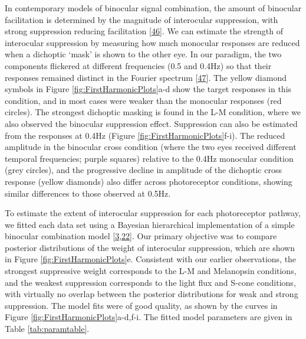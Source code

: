 \documentclass[
]{article}
\begin{document}
In contemporary models of binocular signal combination, the amount of binocular facilitation is determined by the magnitude of interocular suppression, with strong suppression reducing facilitation {[}\protect\hyperlink{ref-Kingdom2015}{46}{]}. We can estimate the strength of interocular suppression by measuring how much monocular responses are reduced when a dichoptic `mask' is shown to the other eye. In our paradigm, the two components flickered at different frequencies (0.5 and 0.4Hz) so that their responses remained distinct in the Fourier spectrum {[}\protect\hyperlink{ref-Busse2009}{47}{]}. The yellow diamond symbols in Figure \ref{fig:FirstHarmonicPlots}a-d show the target responses in this condition, and in most cases were weaker than the monocular responses (red circles). The strongest dichoptic masking is found in the L-M condition, where we also observed the binocular suppression effect. Suppression can also be estimated from the responses at 0.4Hz (Figure \ref{fig:FirstHarmonicPlots}f-i). The reduced amplitude in the binocular cross condition (where the two eyes received different temporal frequencies; purple squares) relative to the 0.4Hz monocular condition (grey circles), and the progressive decline in amplitude of the dichoptic cross response (yellow diamonds) also differ across photoreceptor conditions, showing similar differences to those observed at 0.5Hz.

To estimate the extent of interocular suppression for each photoreceptor pathway, we fitted each data set using a Bayesian hierarchical implementation of a simple binocular combination model {[}\protect\hyperlink{ref-Segala2023}{3},\protect\hyperlink{ref-Meese2006}{22}{]}. Our primary objective was to compare posterior distributions of the weight of interocular suppression, which are shown in Figure \ref{fig:FirstHarmonicPlots}e. Consistent with our earlier observations, the strongest suppressive weight corresponds to the L-M and Melanopsin conditions, and the weakest suppression corresponds to the light flux and S-cone conditions, with virtually no overlap between the posterior distributions for weak and strong suppression. The model fits were of good quality, as shown by the curves in Figure \ref{fig:FirstHarmonicPlots}a-d,f-i. The fitted model parameters are given in Table \ref{tab:paramtable}.
\end{document}
